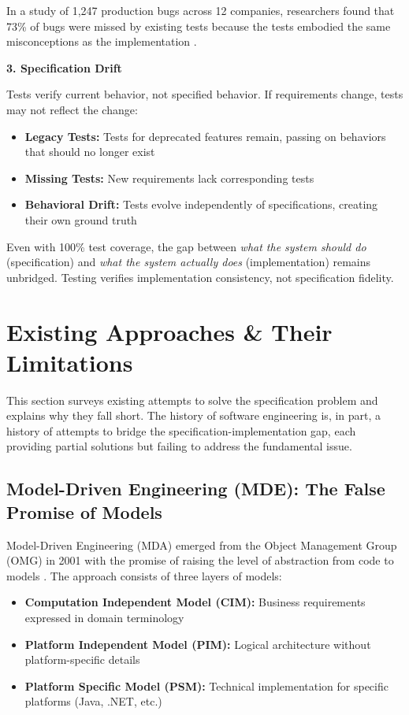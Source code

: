 In a study of 1,247 production bugs across 12 companies, researchers found that 73\% of bugs were missed by existing tests because the tests embodied the same misconceptions as the implementation \cite{zeller2019testing}.

\textbf{3. Specification Drift}

Tests verify current behavior, not specified behavior. If requirements change, tests may not reflect the change:

\begin{itemize}
    \item \textbf{Legacy Tests:} Tests for deprecated features remain, passing on behaviors that should no longer exist
    \item \textbf{Missing Tests:} New requirements lack corresponding tests
    \item \textbf{Behavioral Drift:} Tests evolve independently of specifications, creating their own ground truth
\end{itemize}

Even with 100\% test coverage, the gap between \textit{what the system should do} (specification) and \textit{what the system actually does} (implementation) remains unbridged. Testing verifies implementation consistency, not specification fidelity.

\section{Existing Approaches \& Their Limitations}

This section surveys existing attempts to solve the specification problem and explains why they fall short. The history of software engineering is, in part, a history of attempts to bridge the specification-implementation gap, each providing partial solutions but failing to address the fundamental issue.

\subsection{Model-Driven Engineering (MDE): The False Promise of Models}

Model-Driven Engineering (MDA) emerged from the Object Management Group (OMG) in 2001 with the promise of raising the level of abstraction from code to models \cite{mda2001}. The approach consists of three layers of models:

\begin{itemize}
    \item \textbf{Computation Independent Model (CIM):} Business requirements expressed in domain terminology
    \item \textbf{Platform Independent Model (PIM):} Logical architecture without platform-specific details
    \item \textbf{Platform Specific Model (PSM):} Technical implementation for specific platforms (Java, .NET, etc.)
\end{itemize}

